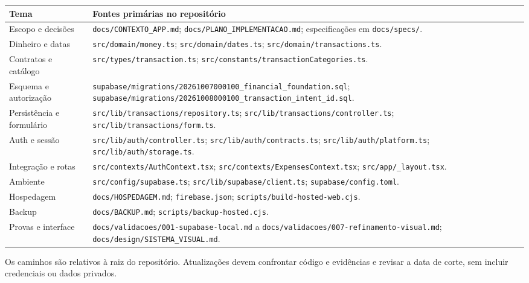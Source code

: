 \documentclass[
    12pt,
    oneside,
    a4paper,
    brazil
]{abntex2}
\newcommand{\caminho}[1]{{\small\nolinkurl{#1}}}
\begin{document}
\begin{longtable}{@{}p{}p{}@{}}
\toprule
\textbf{Tema} & \textbf{Fontes primárias no repositório} \\
\midrule
\endhead
Escopo e decisões & \caminho{docs/CONTEXTO_APP.md}; \caminho{docs/PLANO_IMPLEMENTACAO.md}; especificações em \caminho{docs/specs/}. \\
Dinheiro e datas & \caminho{src/domain/money.ts}; \caminho{src/domain/dates.ts}; \caminho{src/domain/transactions.ts}. \\
Contratos e catálogo & \caminho{src/types/transaction.ts}; \caminho{src/constants/transactionCategories.ts}. \\
Esquema e autorização & \caminho{supabase/migrations/20261007000100_financial_foundation.sql}; \caminho{supabase/migrations/20261008000100_transaction_intent_id.sql}. \\
Persistência e formulário & \caminho{src/lib/transactions/repository.ts}; \caminho{src/lib/transactions/controller.ts}; \caminho{src/lib/transactions/form.ts}. \\
Auth e sessão & \caminho{src/lib/auth/controller.ts}; \caminho{src/lib/auth/contracts.ts}; \caminho{src/lib/auth/platform.ts}; \caminho{src/lib/auth/storage.ts}. \\
Integração e rotas & \caminho{src/contexts/AuthContext.tsx}; \caminho{src/contexts/ExpensesContext.tsx}; \caminho{src/app/_layout.tsx}. \\
Ambiente & \caminho{src/config/supabase.ts}; \caminho{src/lib/supabase/client.ts}; \caminho{supabase/config.toml}. \\
Hospedagem & \caminho{docs/HOSPEDAGEM.md}; \caminho{firebase.json}; \caminho{scripts/build-hosted-web.cjs}. \\
Backup & \caminho{docs/BACKUP.md}; \caminho{scripts/backup-hosted.cjs}. \\
Provas e interface & \caminho{docs/validacoes/001-supabase-local.md} a \caminho{docs/validacoes/007-refinamento-visual.md}; \caminho{docs/design/SISTEMA_VISUAL.md}. \\
\bottomrule
\end{longtable}

Os caminhos são relativos à raiz do repositório. Atualizações devem confrontar código e evidências e revisar a data de corte, sem incluir credenciais ou dados privados.

\postextual

\end{document}
